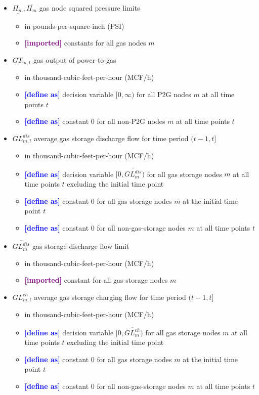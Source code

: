 \documentclass{article}
\newcommand{\lo}[1]{\underline{#1}}
\newcommand{\hi}[1]{\overline{#1}}
\newcommand{\define}{\textcolor{blue}{\textbf{[define as] }}}
\newcommand{\imported}{\textcolor{purple}{\textbf{[imported] }}}
\begin{document}
\begin{itemize}
\item $\lo{\Pi_m}, \hi{\Pi_m}$ gas node squared pressure limits
  \begin{itemize}
  \item in pounds-per-square-inch (PSI)
  \item \imported constants for all gas nodes $m$
  \end{itemize}

\item $GT_{m,t}$ gas output of power-to-gas
  \begin{itemize}
  \item in thousand-cubic-feet-per-hour (MCF/h)
  \item \define decision variable $[0, \infty)$ for all P2G nodes $m$ at all
    time points $t$
  \item \define constant $0$ for all non-P2G nodes $m$ at all time points $t$
  \end{itemize}

\item $GL^{dis}_{m,t}$ average gas storage discharge flow for time period $(t-1,
  t]$
  \begin{itemize}
  \item in thousand-cubic-feet-per-hour (MCF/h)
  \item \define decision variable $[0, \hi{GL^{dis}_m})$ for all gas storage
    nodes $m$ at all time points $t$ excluding the initial time point
  \item \define constant $0$ for all gas storage nodes $m$ at the initial time
    point $t$
  \item \define constant $0$ for all non-gas-storage nodes $m$ at all time
    points $t$
  \end{itemize}

\item $\hi{GL^{dis}_m}$ gas storage discharge flow limit
  \begin{itemize}
  \item in thousand-cubic-feet-per-hour (MCF/h)
  \item \imported constant for all gas-storage nodes $m$
  \end{itemize}

\item $GL^{ch}_{m,t}$ average gas storage charging flow for time period $(t-1,
  t]$
  \begin{itemize}
  \item in thousand-cubic-feet-per-hour (MCF/h)
  \item \define decision variable $[0, \hi{GL^{ch}_m})$ for all gas storage
    nodes $m$ at all time points $t$ excluding the initial time point
  \item \define constant $0$ for all gas storage nodes $m$ at the initial time
    point $t$
  \item \define constant $0$ for all non-gas-storage nodes $m$ at all time
    points $t$
  \end{itemize}


\end{itemize}
\end{document}
